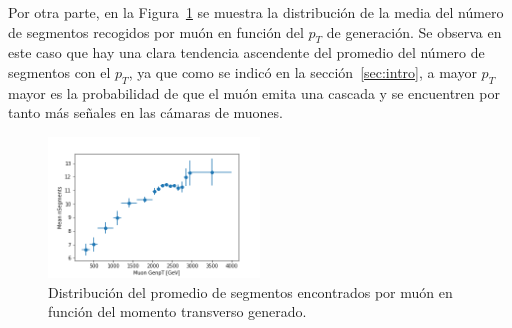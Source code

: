 Por otra parte, en la Figura~\ref{fig:data_nSegmentsMean} se muestra la distribuci\'on de la media del n\'umero de segmentos recogidos por mu\'on en funci\'on del $p_{T}$ de generaci\'on. Se observa en este caso que hay una clara tendencia ascendente del promedio del n\'umero de segmentos con el $p_{T}$, ya que como se indic\'o en la secci\'on~\ref{sec:intro}, a mayor $p_{T}$ mayor es la probabilidad de que el mu\'on emita una cascada y se encuentren por tanto m\'as se\~nales en las c\'amaras de muones.


\begin{figure}[h]
\centering
\includegraphics[width=0.5\textwidth]{figures/data_simple_genpt_MeanNSegments.png}
\caption{Distribuci\'on del promedio de segmentos encontrados por mu\'on en funci\'on del momento transverso generado.}
\label{fig:data_nSegmentsMean}        
\end{figure}
